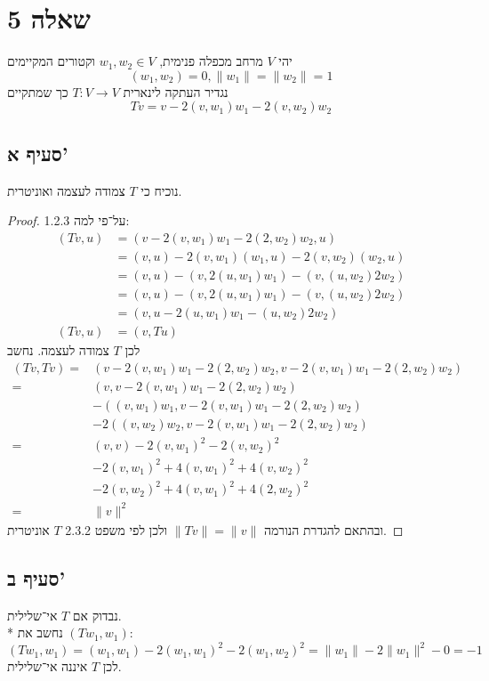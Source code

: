 \section{שאלה 5}
יהי $V$ מרחב מכפלה פנימית, $w_1, w_2 \in V$ וקטורים המקיימים
\[
	(w_1, w_2) = 0, \lVert w_1 \rVert = \lVert w_2 \rVert = 1
\]
נגדיר העתקה לינארית $T: V \to V$ כך שמתקיים
\[
	Tv = v - 2(v, w_1) w_1 - 2(v, w_2) w_2
\]

\subsection{סעיף א'}
נוכיח כי $T$ צמודה לעצמה ואוניטרית.
\begin{proof}
	על־פי למה 1.2.3:
	\begin{align*}
		(T v, u)
		& = (v - 2(v, w_1) w_1 - 2(2, w_2) w_2, u) \\
		& = (v, u) - 2 (v, w_1) (w_1, u) - 2(v, w_2) (w_2, u) \\
		& = (v, u) - (v, 2 (u, w_1) w_1) - (v, (u, w_2) 2w_2) \\
		& = (v, u) - (v, 2 (u, w_1) w_1) - (v, (u, w_2) 2w_2) \\
		& = (v, u - 2 (u, w_1) w_1 - (u, w_2) 2w_2) \\
		(T v, u) & = (v, T u)
	\end{align*}
	לכן $T$ צמודה לעצמה. \*
	נחשב
	\begin{align*}
		(T v, T v)
		= & (v - 2(v, w_1) w_1 - 2(2, w_2) w_2, v - 2(v, w_1) w_1 - 2(2, w_2) w_2) \\
		= & (v, v - 2(v, w_1) w_1 - 2(2, w_2) w_2) \\
		& - ((v, w_1) w_1, v - 2(v, w_1) w_1 - 2(2, w_2) w_2) \\
		& - 2((v, w_2) w_2, v - 2(v, w_1) w_1 - 2(2, w_2) w_2) \\
		= & (v, v) - 2 {(v, w_1)}^2 - 2{(v, w_2)}^2 \\
		& - 2{(v, w_1)}^2 + 4{(v, w_1)}^2  + 4{(v, w_2)}^2 \\
		& - 2{(v, w_2)}^2 + 4{(v, w_1)}^2 + 4{(2, w_2)}^2 \\
		= & \lVert v\rVert^2
	\end{align*}
	ובהתאם להגדרת הנורמה $\lVert T v \rVert = \lVert v \rVert$ ולכן לפי משפט 2.3.2 $T$ אוניטרית.
\end{proof}

\subsection{סעיף ב'}
נבדוק אם $T$ אי־שלילית. \\*
נחשב את $(T w_1, w_1)$:
\[
	(T w_1, w_1)
	= (w_1, w_1) - 2 {(w_1, w_1)}^2 - 2{(w_1, w_2)}^2
	= \lVert w_1 \rVert - 2\lVert w_1 \rVert^2 - 0
	= -1
\]
לכן $T$ איננה אי־שלילית.


